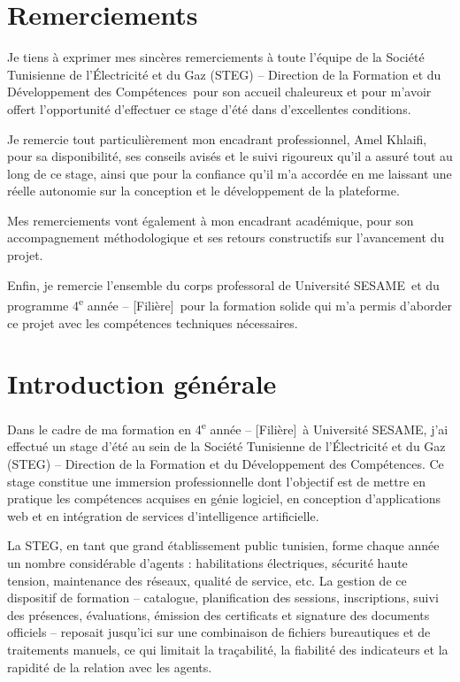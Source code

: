 \documentclass[12pt,a4paper,oneside,openany]{report}
\newcommand{\ecole}{Université SESAME}
\newcommand{\filiere}{4\textsuperscript{e} année -- [Filière]}
\newcommand{\organisme}{Société Tunisienne de l'Électricité et du Gaz (STEG) -- Direction de la Formation et du Développement des Compétences}
\newcommand{\encadrantPro}{Amel Khlaifi}
\begin{document}

\chapter*{Remerciements}

Je tiens à exprimer mes sincères remerciements à toute l'équipe de la \organisme\ pour son accueil chaleureux et pour m'avoir offert l'opportunité d'effectuer ce stage d'été dans d'excellentes conditions.

Je remercie tout particulièrement mon encadrant professionnel, \encadrantPro, pour sa disponibilité, ses conseils avisés et le suivi rigoureux qu'il a assuré tout au long de ce stage, ainsi que pour la confiance qu'il m'a accordée en me laissant une réelle autonomie sur la conception et le développement de la plateforme.

Mes remerciements vont également à mon encadrant académique, pour son accompagnement méthodologique et ses retours constructifs sur l'avancement du projet.

Enfin, je remercie l'ensemble du corps professoral de \ecole\ et du programme \filiere\ pour la formation solide qui m'a permis d'aborder ce projet avec les compétences techniques nécessaires.

\tableofcontents
\listoffigures
\listoftables

\chapter*{Introduction générale}

Dans le cadre de ma formation en \filiere\ à \ecole, j'ai effectué un stage d'été au sein de la \organisme. Ce stage constitue une immersion professionnelle dont l'objectif est de mettre en pratique les compétences acquises en génie logiciel, en conception d'applications web et en intégration de services d'intelligence artificielle.

La STEG, en tant que grand établissement public tunisien, forme chaque année un nombre considérable d'agents : habilitations électriques, sécurité haute tension, maintenance des réseaux, qualité de service, etc. La gestion de ce dispositif de formation -- catalogue, planification des sessions, inscriptions, suivi des présences, évaluations, émission des certificats et signature des documents officiels -- reposait jusqu'ici sur une combinaison de fichiers bureautiques et de traitements manuels, ce qui limitait la traçabilité, la fiabilité des indicateurs et la rapidité de la relation avec les agents.
\end{document}
